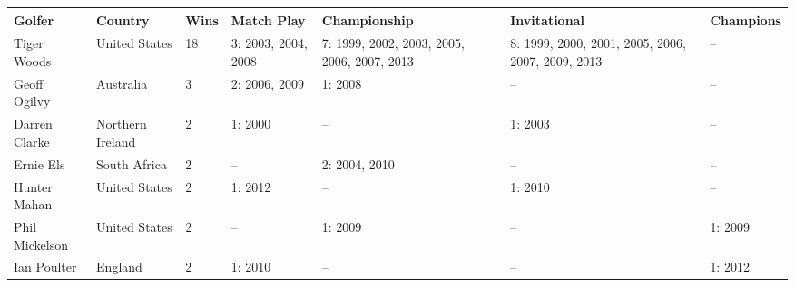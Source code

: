 \documentclass{article}
\begin{document}
\begin{tabular}{lllllll}
\toprule
Golfer & Country & Wins & Match Play & Championship & Invitational & Champions \\
\midrule
Tiger Woods & United States & 18 & 3: 2003, 2004, 2008 & 7: 1999, 2002, 2003, 2005, 2006, 2007, 2013 & 8: 1999, 2000, 2001, 2005, 2006, 2007, 2009, 2013 & -- \\
Geoff Ogilvy & Australia & 3 & 2: 2006, 2009 & 1: 2008 & -- & -- \\
Darren Clarke & Northern Ireland & 2 & 1: 2000 & -- & 1: 2003 & -- \\
Ernie Els & South Africa & 2 & -- & 2: 2004, 2010 & -- & -- \\
Hunter Mahan & United States & 2 & 1: 2012 & -- & 1: 2010 & -- \\
Phil Mickelson & United States & 2 & -- & 1: 2009 & -- & 1: 2009 \\
Ian Poulter & England & 2 & 1: 2010 & -- & -- & 1: 2012 \\
\bottomrule
\end{tabular}
\end{document}
